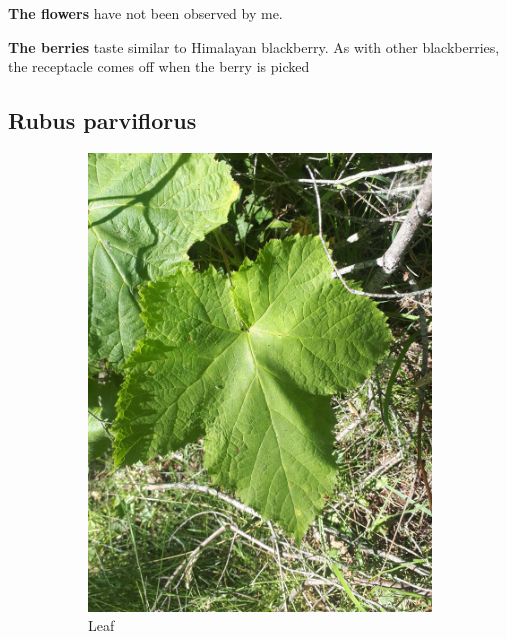 \textbf{The flowers} have not been observed by me.

\textbf{The berries} taste similar to Himalayan blackberry. As with other blackberries, the receptacle comes off when the berry is picked


\subsection{Rubus parviflorus}

\begin{figure}
\centering
\begin{subfigure}{0.48\textwidth}
    \includegraphics[width=\textwidth]{rubus/parviflorus_leaf_01}
    \caption{Leaf}
    \label{fig:rub:parviflorus:leaf}
\end{subfigure}
\hfill
\begin{subfigure}{0.48\textwidth}

\end{subfigure}
\end{figure}
